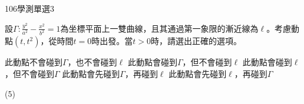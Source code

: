 \begin{QUESTIONS}
\begin{QUESTION}
\begin{QSOLLIST}
        \end{QSOLLIST}
        \begin{QEMPTYSPACE}
        \end{QEMPTYSPACE}
    \end{QUESTION}
    \begin{QUESTION}
        \begin{ExamInfo}{106}{學測}{單選}{3}
        \end{ExamInfo}
        \begin{ExamAnsRateInfo}{38}{71}{34}{9}
        \end{ExamAnsRateInfo}
        \begin{QBODY}
            設$\Gamma :\frac{{{y}^{2}}}{{{a}^{2}}}-\frac{{{x}^{2}}}{{{b}^{2}}}=1$為坐標平面上一雙曲線，且其通過第一象限的漸近線為$\ell $。考慮動點$(t,{{t}^{2}})$，從時間$t=0$時出發。當$t>0$時，請選出正確的選項。
			\begin{QOPS}
			\QOP 此動點不會碰到$\Gamma $，也不會碰到$\ell $
			\QOP 此動點會碰到$\Gamma $，但不會碰到$\ell $
			\QOP 此動點會碰到$\ell $，但不會碰到$\Gamma $
			\QOP 此動點會先碰到$\Gamma $，再碰到$\ell $
			\QOP 此動點會先碰到$\ell $，再碰到$\Gamma $
			\end{QOPS}
        \end{QBODY}
        \begin{QFROMS}
        \end{QFROMS}
        \begin{QTAGS}\end{QTAGS}
        \begin{QANS}
            (5)
        \end{QANS}
        \begin{QSOLLIST}
            \begin{QSOL}[SOLID=23]
                \begin{QSTEPS}
                \end{QSTEPS}
            \end{QSOL}


\end{QSOLLIST}
\end{QUESTION}
\end{QUESTIONS}
